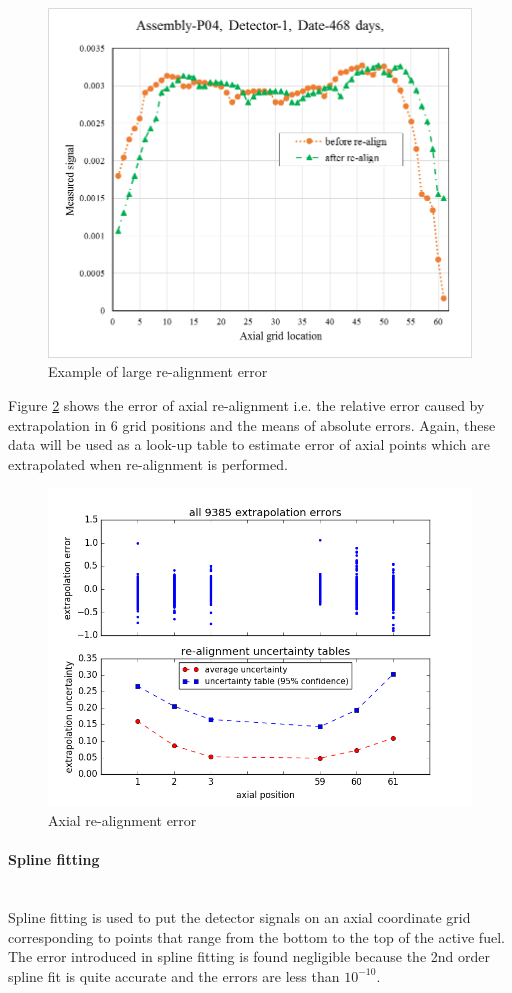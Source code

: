 \documentclass{article}
\begin{document}
\begin{figure}[ht]
\centering
\includegraphics[keepaspectratio, width = 4.0 in]{figures/flux_map_uncertainties/Re-align_large_error.png}
\caption{Example of large re-alignment error}
\label{fig:fig_alignment_error_ex}
\end{figure}

Figure \ref{fig:fig_realgin_error} shows the error of axial re-alignment i.e. the relative error caused by extrapolation in 6 grid positions and the means of absolute errors. Again, these data will be used as a look-up table to estimate error of axial points which are extrapolated when re-alignment is performed.

\begin{figure}[ht]
\centering
\includegraphics[keepaspectratio, width = 4.0 in]{figures/flux_map_uncertainties/realgin_error.png}
\caption{Axial re-alignment error}
\label{fig:fig_realgin_error}
\end{figure}

\paragraph{Spline fitting}
\mbox{ }\\
Spline fitting is used to put the detector signals on an axial coordinate grid corresponding to points that range from the bottom to the top of the active fuel. The error introduced in spline fitting is found negligible because the 2nd order spline fit is quite accurate and the errors are less than ${10}^{-10}$.
\end{document}
